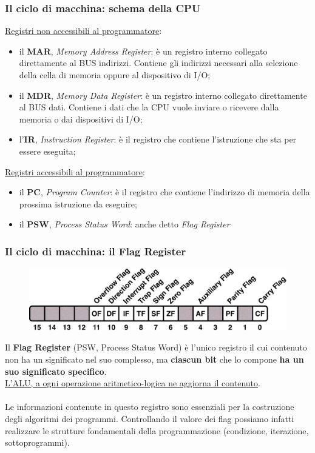 \begin{frame}
	\frametitle{Il ciclo di macchina: schema della CPU}
	
	\underline{Registri non accessibili al programmatore}:
	\begin{itemize}
		\item il \textbf{MAR}, \textit{Memory Address Register}: è un registro interno collegato direttamente al BUS indirizzi. Contiene gli indirizzi necessari alla selezione della cella di memoria oppure al dispositivo di I/O;
		\item il \textbf{MDR}, \textit{Memory Data Register}: è un registro interno collegato direttamente al BUS dati. Contiene i dati che la CPU vuole inviare o ricevere dalla memoria o dai dispositivi di I/O;%
		\item l'\textbf{IR}, \textit{Instruction Register}: è il registro che contiene l'istruzione che sta per essere eseguita;
	\end{itemize}
	
	\underline{Registri accessibili al programmatore}:
	\begin{itemize}
		\item il \textbf{PC}, \textit{Program Counter}: è il registro che contiene l'indirizzo di memoria della prossima istruzione da eseguire;
		\item il \textbf{PSW}, \textit{Process Status Word}: anche detto \textit{Flag Register}
	\end{itemize}
	 
\end{frame}


\begin{frame}
	\frametitle{Il ciclo di macchina: il Flag Register}
	
	\begin{figure}[!htbp] 
		\centering
		\includegraphics[width=0.7\linewidth]{images/4_cpu/flag_register.pdf}
		\label{fig:cpu_complex}
	\end{figure}
	
	Il \textbf{Flag Register} (PSW, Process Status Word) è l'unico registro il cui contenuto non ha un significato nel suo complesso, ma \textbf{ciascun bit} che lo compone \textbf{ha un suo significato specifico}.\\
	\underline{L’ALU, a ogni operazione aritmetico-logica ne aggiorna il contenuto}.\\~\\
	Le informazioni contenute in questo registro sono essenziali per la costruzione degli algoritmi dei programmi. Controllando il valore dei flag possiamo infatti realizzare le strutture fondamentali della programmazione (condizione, iterazione, sottoprogrammi).
	 
\end{frame}


